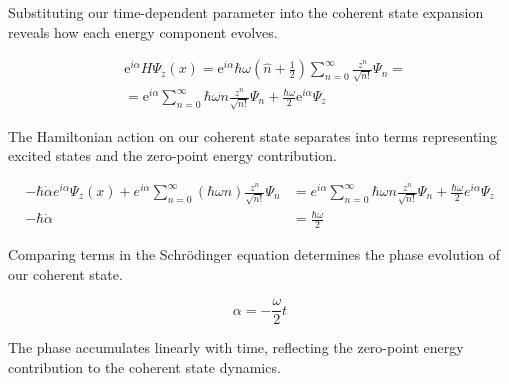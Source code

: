 Substituting our time-dependent parameter into the coherent state expansion reveals how each energy component evolves.

\begin{align}
& \mathrm{e}^{i \alpha} H \Psi_{z}(x)=\mathrm{e}^{i \alpha} \hbar \omega\left(\hat{n}+\frac{1}{2}\right) \sum_{n=0}^{\infty} \frac{z^{n}}{\sqrt{n!}} \Psi_{n}=  \\
& =\mathrm{e}^{i \alpha} \sum_{n=0}^{\infty} \hbar \omega n \frac{z^{n}}{\sqrt{n!}} \Psi_{n}+\frac{\hbar \omega}{2} \mathrm{e}^{i \alpha} \Psi_{z}
\end{align}

The Hamiltonian action on our coherent state separates into terms representing excited states and the zero-point energy contribution.

\begin{align}
-\hbar \dot{\alpha} e^{i \alpha} \Psi_{z}(x)+e^{i \alpha} \sum_{n=0}^{\infty}(\hbar \omega n) \frac{z^{n}}{\sqrt{n!}} \Psi_{n} & =e^{i \alpha} \sum_{n=0}^{\infty} \hbar \omega n \frac{z^{n}}{\sqrt{n!}} \Psi_{n}+\frac{\hbar \omega}{2} e^{i \alpha} \Psi_{z}  \\
-\hbar \dot{\alpha} & =\frac{\hbar \omega}{2}
\end{align}

Comparing terms in the Schrödinger equation determines the phase evolution of our coherent state.

\begin{equation}
\alpha=-\frac{\omega}{2} t
\end{equation}

The phase accumulates linearly with time, reflecting the zero-point energy contribution to the coherent state dynamics.
